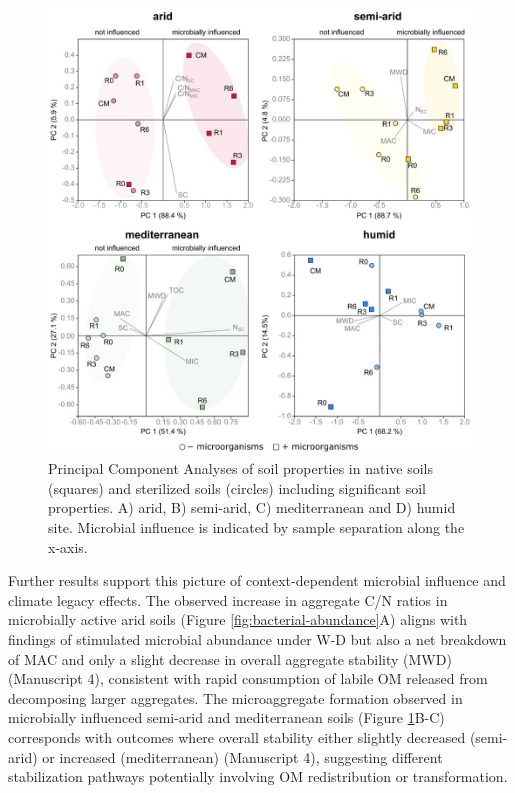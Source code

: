 \begin{figure}[ht!]
	\centering
	\includegraphics[width=1\textwidth]{img/PCA-microbes-structure.jpg}
	\caption[Principal Component Analyses of soil properties in native and sterilized soils including significant soil properties]{Principal Component Analyses of soil properties in native soils (squares) and sterilized soils (circles) including significant soil properties. A) arid, B) semi-arid, C) mediterranean and D) humid site. Microbial influence is indicated by sample separation along the x-axis.}
	\label{fig:PCA-microbes}
\end{figure}

\FloatBarrier

Further results support this picture of context-dependent microbial influence and climate legacy effects. The observed increase in aggregate C/N ratios in microbially active arid soils (Figure \ref{fig:bacterial-abundance}A) aligns with findings of stimulated microbial abundance under W-D but also a net breakdown of MAC and only a slight decrease in overall aggregate stability (MWD) (Manuscript 4), consistent with rapid consumption of labile OM released from decomposing larger aggregates. The microaggregate formation observed in microbially influenced semi-arid and mediterranean soils (Figure \ref{fig:PCA-microbes}B-C) corresponds with outcomes where overall stability either slightly decreased (semi-arid) or increased (mediterranean) (Manuscript 4), suggesting different stabilization pathways potentially involving OM redistribution or transformation.

